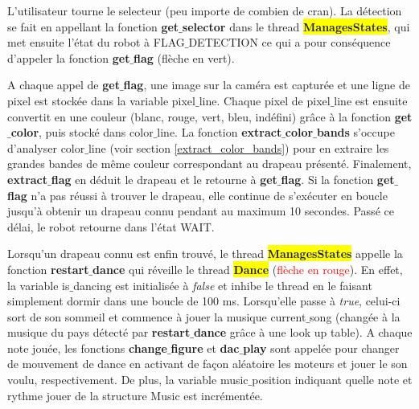 \documentclass{article}
\begin{document}
    L'utilisateur tourne le selecteur (peu importe de combien de cran). 
    La détection se fait en appellant la fonction \textbf{get$\_$selector} dans le thread \colorbox{yellow}{\textbf{ManagesStates}}, qui met ensuite l'état du robot à \textcolor{bleu}{FLAG$\_$DETECTION} ce qui a pour conséquence d'appeler la fonction \textbf{get$\_$flag} (\textcolor{vert}{flèche en vert}). \\ \par
    
    A chaque appel de \textbf{get$\_$flag}, une image sur la caméra est capturée et une ligne de pixel est stockée dans la variable \textcolor{bleu}{pixel$\_$line}. 
    Chaque pixel de \textcolor{bleu}{pixel$\_$line} est ensuite convertit en une couleur (blanc, rouge, vert, bleu, indéfini) grâce à la fonction \textbf{get$\_$color}, puis stocké dans \textcolor{bleu}{color$\_$line}. 
    La fonction \textbf{extract$\_$color$\_$bands} s'occupe d'analyser \textcolor{bleu}{color$\_$line} (voir section \ref{extract_color_bands}) pour en extraire les grandes bandes de même couleur correspondant au drapeau présenté. 
    Finalement, \textbf{extract$\_$flag} en déduit le drapeau et le retourne à \textbf{get$\_$flag}. 
    Si la fonction \textbf{get$\_$flag} n'a pas réussi à trouver le drapeau, elle continue de s'exécuter en boucle jusqu'à obtenir un drapeau connu pendant au maximum 10 secondes. 
    Passé ce délai, le robot retourne dans l'état \textcolor{bleu}{WAIT}. \\ \par
    
    Lorsqu'un drapeau connu est enfin trouvé, le thread \colorbox{yellow}{\textbf{ManagesStates}} appelle la fonction \textbf{restart$\_$dance} qui réveille le thread \colorbox{yellow}{\textbf{Dance}} (\textcolor{red}{flèche en rouge}). 
    En effet, la variable \textcolor{bleu}{is$\_$dancing} est initialisée à \textit{false} et inhibe le thread en le faisant simplement dormir dans une boucle de 100 ms. 
    Lorsqu'elle passe à \textit{true}, celui-ci sort de son sommeil et commence à jouer la musique \textcolor{bleu}{current$\_$song} (changée à la musique du pays détecté par \textbf{restart$\_$dance} grâce à une look up table). 
    A chaque note jouée, les fonctions \textbf{change$\_$figure} et \textbf{dac$\_$play} sont appelée pour changer de mouvement de dance en activant de façon aléatoire les moteurs et jouer le son voulu, respectivement. 
    De plus, la variable \textcolor{bleu}{music$\_$position} indiquant quelle note et rythme jouer de la structure \textcolor{bleu}{Music} est incrémentée. \\ \par
    
\end{document}
